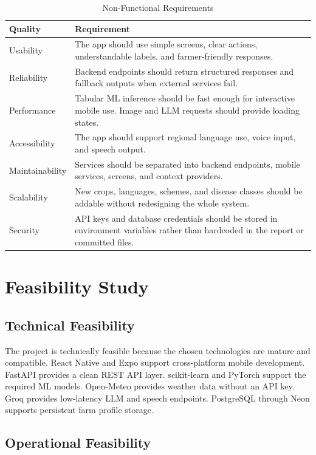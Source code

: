 \documentclass[12pt,a4paper]{report}
\begin{document}
\begin{table}[H]
\centering
\caption{Non-Functional Requirements}
\label{tab:nfr}
\begin{tabular}{p{3cm}p{10.5cm}}
\toprule
\textbf{Quality} & \textbf{Requirement} \\
\midrule
Usability & The app should use simple screens, clear actions, understandable labels, and farmer-friendly responses. \\
Reliability & Backend endpoints should return structured responses and fallback outputs when external services fail. \\
Performance & Tabular ML inference should be fast enough for interactive mobile use. Image and LLM requests should provide loading states. \\
Accessibility & The app should support regional language use, voice input, and speech output. \\
Maintainability & Services should be separated into backend endpoints, mobile services, screens, and context providers. \\
Scalability & New crops, languages, schemes, and disease classes should be addable without redesigning the whole system. \\
Security & API keys and database credentials should be stored in environment variables rather than hardcoded in the report or committed files. \\
\bottomrule
\end{tabular}
\end{table}

\section{Feasibility Study}

\subsection{Technical Feasibility}

The project is technically feasible because the chosen technologies are mature and compatible. React Native and Expo support cross-platform mobile development. FastAPI provides a clean REST API layer. scikit-learn and PyTorch support the required ML models. Open-Meteo provides weather data without an API key. Groq provides low-latency LLM and speech endpoints. PostgreSQL through Neon supports persistent farm profile storage.

\subsection{Operational Feasibility}
\end{document}
